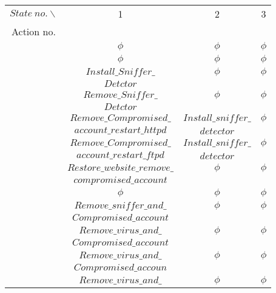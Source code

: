 \documentclass{acm_proc_article-sp}
\begin{document}
\newcommand{\Rowna}{\stepcounter{Rownumbera}\theRownumbera}
\renewcommand{\multirowsetup}{\centering}
\begin{table}[htpb]
\scriptsize
\centering
\begin{tabular}{cccc}\hline
$State~no.\backslash$  &  1      &  2       & 3         \\
Action no.             &         &          &           \\\hline
\Rowna                 & $\phi$  &  $\phi$  & $\phi$    \\
\Rowna                 & $\phi$  &  $\phi$  & $\phi$    \\
\Rowna                 & $Install\_Sniffer\_$  & $\phi$ &   $\phi$\\
                       & $Detctor$   &    &   \\
\Rowna                 & $Remove\_Sniffer\_$  &  $\phi$     &   $\phi$\\
                       & $Detctor$ &   &  \\
\Rowna                 & $Remove\_Compromised\_$  &  $Install\_sniffer\_$  &   $\phi$\\
                       & $account\_restart\_httpd$  & $detector$ &    \\
\Rowna                 & $Remove\_Compromised\_$  &  $Install\_sniffer\_$  &   $\phi$\\
                       & $account\_restart\_ftpd$  & $detector$ &  \\
\Rowna                 & $Restore\_website\_remove\_$  &  $\phi$     &   $\phi$\\
                       & $compromised\_account$  &   &   \\
\Rowna                 & $\phi$  &  $\phi$     &   $\phi$\\
\Rowna                 & $Remove\_sniffer\_and\_$  &  $\phi$     &   $\phi$\\
                       & $Compromised\_account$  &     &   \\
\Rowna                 & $Remove\_virus\_and\_$  &  $\phi$     &   $\phi$ \\
                       & $Compromised\_account$  &   &   \\
\Rowna                 & $Remove\_virus\_and\_$  &  $\phi$     &   $\phi$\\
                       & $Compromised\_accoun$  &   &   \\
\Rowna                 & $Remove\_virus\_and\_$  &  $\phi$     &   $\phi$\\

\end{tabular}
\end{table}
\end{document}
